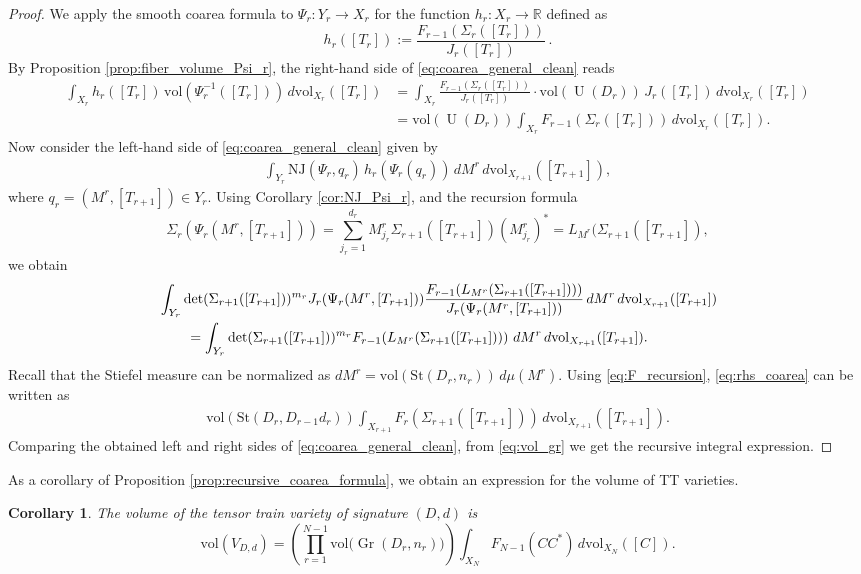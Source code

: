 \documentclass{article}
\newtheorem{corollary}[theorem]{Corollary}
\theoremstyle{definition}
\DeclareMathOperator{\Gr}{Gr}
\DeclareMathOperator{\U}{U}
\newcommand{\R}{\mathbb{R}}
\newcommand{\vol}{\mathrm{vol}}
\newcommand{\St}{\mathrm{St}}
\newcommand{\NJ}{\mathrm{NJ}}
\begin{document}
\begin{proof}
We apply the smooth coarea formula to \(\Psi_r:Y_r\rightarrow X_r\) for the function $h_r:X_r\to \R$ defined as 
\begin{equation*}
h_r([T_r]):= \frac{F_{r-1}(\Sigma_r([T_r]))}{J_r([T_{r}])}\,.
\end{equation*}
By Proposition \ref{prop:fiber_volume_Psi_r}, the right-hand side of \eqref{eq:coarea_general_clean} reads
\begin{align*}
\int_{X_r}h_r([T_r])\,\vol(\Psi_r^{-1}([T_r]))\,d\vol_{X_r}([T_r]) &= \int_{X_r}
\frac{F_{r-1}(\Sigma_r([T_r]))}{ J_r([T_{r}])}
\cdot
\vol(\U(D_r))\,J_r([T_{r}])
\,d\vol_{X_r}([T_r]) \\
&= \vol(\U(D_r))
\int_{X_r}F_{r-1}(\Sigma_r([T_r]))\,d\vol_{X_r}([T_r]).
\end{align*}
Now consider the left-hand side of \eqref{eq:coarea_general_clean} given by
\begin{align*}
\int_{Y_r}
\NJ(\Psi_r,q_r)\,
h_r(\Psi_r(q_r))
\,dM^r\,d\vol_{X_{r+1}}([T_{r+1}]),
\end{align*}
where $q_r=(M^r,[T_{r+1}])\in Y_r$. Using Corollary \ref{cor:NJ_Psi_r}, and the recursion
formula
\[
\Sigma_r(\Psi_r(M^r,[T_{r+1}]))
=
\sum_{j_r=1}^{d_r}
M^r_{j_r}\Sigma_{r+1}([T_{r+1}])(M^r_{j_r})^* = L_{M^r}(\Sigma_{r+1}([T_{r+1}]),
\]
we obtain
\begin{align}
\notag &\int_{Y_r}
\det(\Sigma_{r+1}([T_{r+1}]))^{m_r}
J_r(\Psi_r(M^r,[T_{r+1}]))
\frac{
F_{r-1}\!\left(L_{M^r}(\Sigma_{r+1}([T_{r+1}]))
\right)
}{
J_r(\Psi_r(M^r,[T_{r+1}]))
}
\,dM^r\,d\vol_{X_{r+1}}([T_{r+1}]) \\ \label{eq:rhs_coarea}
&\qquad=
\int_{Y_r}
\det(\Sigma_{r+1}([T_{r+1}]))^{m_r}
F_{r-1}\!\left(L_{M^r}(\Sigma_{r+1}([T_{r+1}]))
\right)
\,dM^r\,d\vol_{X_{r+1}}([T_{r+1}]).
\end{align}
Recall that the Stiefel measure can be normalized as $dM^r=\vol(\St(D_r,n_r))\,d\mu(M^r)$. Using \eqref{eq:F_recursion}, \eqref{eq:rhs_coarea} can be written as
\begin{align*}
\vol(\St(D_r,D_{r-1}d_r))
\int_{X_{r+1}}
F_r(\Sigma_{r+1}([T_{r+1}]))\,d\vol_{X_{r+1}}([T_{r+1}]).
\end{align*}
Comparing the obtained left and right sides of \eqref{eq:coarea_general_clean}, from \eqref{eq:vol_gr} we get the recursive integral expression.
\end{proof}
\noindent
As a corollary of Proposition \ref{prop:recursive_coarea_formula}, we obtain an expression for the volume of TT varieties.
\begin{corollary}\label{cor:full-recursive-volume}
The volume of the tensor train variety of signature $(D, d)$ is
\begin{equation}\label{eq:full-recursive-volume}
\vol(V_{D,d})
=
\left(\prod_{r=1}^{N-1}\vol\bigl(\Gr(D_r,n_r)\bigr)\right)
\int_{X_N}F_{N-1}(CC^*)\,d\vol_{X_N}([C]).
\end{equation}
\end{corollary}
\end{document}
